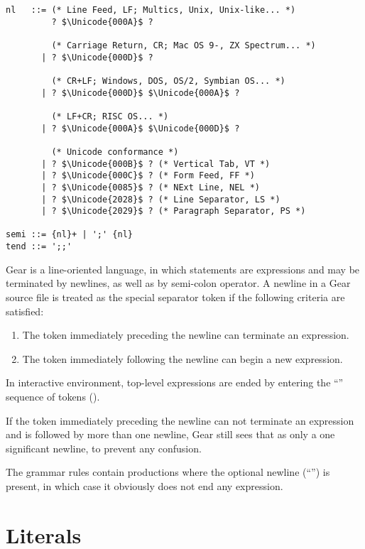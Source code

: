 \syntax\begin{lstlisting}
nl   ::= (* Line Feed, LF; Multics, Unix, Unix-like... *)
         ? $\Unicode{000A}$ ? 
         
         (* Carriage Return, CR; Mac OS 9-, ZX Spectrum... *)
       | ? $\Unicode{000D}$ ? 
       
         (* CR+LF; Windows, DOS, OS/2, Symbian OS... *)
       | ? $\Unicode{000D}$ $\Unicode{000A}$ ?
       
         (* LF+CR; RISC OS... *)
       | ? $\Unicode{000A}$ $\Unicode{000D}$ ?
       
         (* Unicode conformance *)
       | ? $\Unicode{000B}$ ? (* Vertical Tab, VT *)
       | ? $\Unicode{000C}$ ? (* Form Feed, FF *)
       | ? $\Unicode{0085}$ ? (* NExt Line, NEL *)
       | ? $\Unicode{2028}$ ? (* Line Separator, LS *)
       | ? $\Unicode{2029}$ ? (* Paragraph Separator, PS *)
       
semi ::= {nl}+ | ';' {nl}
tend ::= ';;'
\end{lstlisting}

Gear is a line-oriented language, in which statements are expressions and may be terminated by newlines, as well as by semi-colon operator. A newline in a Gear source file is treated as the special separator token \lstinline@nl@ if the following criteria are satisfied:

\begin{enumerate}
  \item The token immediately preceding the newline can terminate an expression.
  \item The token immediately following the newline can begin a new expression. 
\end{enumerate}

In interactive environment, top-level expressions are ended by entering the ``\code{;;}'' sequence of tokens (). 

If the token immediately preceding the newline can not terminate an expression and is followed by more than one newline, Gear still sees that as only a one significant newline, to prevent any confusion.

The grammar rules contain productions where the optional newline (``\code{[nl]}'') is present, in which case it obviously does not end any expression. 






\section{Literals}
\label{sec:literals}

